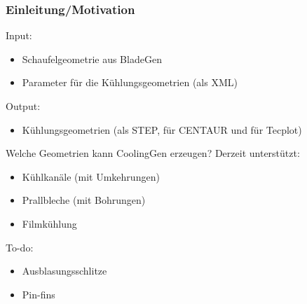 \documentclass[8pt, aspectratio=169]{beamer}
\begin{document}
\begin{frame}
	\frametitle{Einleitung/Motivation}
	\vspace{-1cm}\hspace{-0.5cm}
	\begin{minipage}[t]{\textwidth}
		Input:
		\begin{itemize}
			\item Schaufelgeometrie aus BladeGen
			\item Parameter für die Kühlungsgeometrien (als XML)
		\end{itemize}
		Output:
		\begin{itemize}
			\item Kühlungsgeometrien (als STEP, für CENTAUR und für Tecplot)
		\end{itemize}

		Welche Geometrien kann CoolingGen erzeugen?
		Derzeit unterstützt:
		\begin{itemize}
			\item Kühlkanäle (mit Umkehrungen)
			\item Prallbleche (mit Bohrungen)
			\item Filmkühlung
		\end{itemize}

		To-do:
		\begin{itemize}
			\item Ausblasungsschlitze
			\item Pin-fins
		\end{itemize}
	\end{minipage}
	\vfill
\end{frame}
\end{document}
